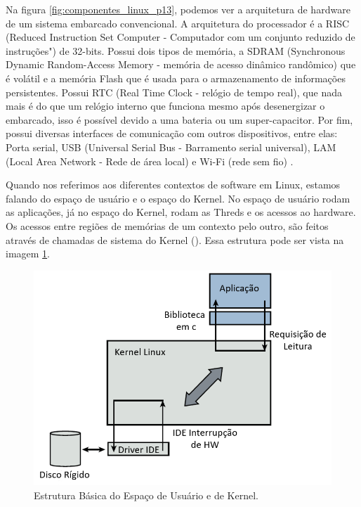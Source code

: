 Na figura \ref{fig:componentes_linux_p13}, podemos ver a arquitetura de hardware de um sistema embarcado convencional. A arquitetura do processador é a RISC (Reduced Instruction Set Computer - Computador com um conjunto reduzido de instruções") de 32-bits. Possui dois tipos de memória, a SDRAM (Synchronous Dynamic Random-Access Memory - memória de acesso dinâmico randômico) que é volátil e a memória Flash que é usada para o armazenamento de informações persistentes. Possui RTC (Real Time Clock - relógio de tempo real), que nada mais é do que um relógio interno que funciona mesmo após desenergizar o embarcado, isso é possível devido a uma bateria ou um super-capacitor. Por fim, possui diversas interfaces de comunicação com outros dispositivos, entre elas: Porta serial, USB (Universal Serial Bus - Barramento serial universal), LAM (Local Area Network - Rede de área local) e Wi-Fi (rede sem fio) \cite{Tobergte2013}.


Quando nos referimos aos diferentes contextos de software em Linux, estamos falando do espaço de usuário e o espaço do Kernel. No espaço de usuário rodam as aplicações, já no espaço do Kernel, rodam as Threds e os acessos ao hardware. Os acessos entre regiões de memórias de um contexto pelo outro, são feitos através de chamadas de sistema do Kernel (\cite{Tobergte2013}). Essa estrutura pode ser vista na imagem \ref{fig:kernel_user_space}.

\begin{figure}[H]
  \caption{Estrutura Básica do Espaço de Usuário e de Kernel.}
  \begin{center}
      \includegraphics[scale=0.55]{img/kernel_user_space}
  \end{center}
  \label{fig:kernel_user_space}
\end{figure}

